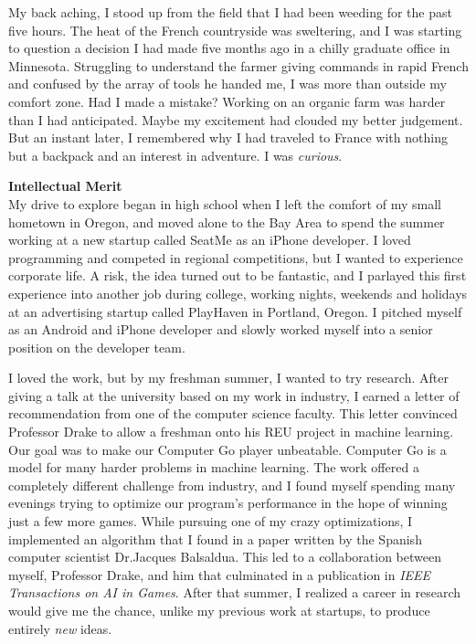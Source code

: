 \documentclass[12pt]{article}
\title{}
\begin{document}
My back aching, I stood up from the field that I had been weeding for the past five hours. The heat of the French countryside was sweltering, and I was starting to question a  decision I had made five months ago in a chilly graduate office in Minnesota. Struggling to understand the farmer giving commands in rapid French and confused by the array of tools he handed me, I was more than outside my comfort zone. Had I made a mistake? Working on an organic farm was harder than I had anticipated. Maybe my excitement had clouded my better judgement. But an instant later, I remembered why I had traveled to France with nothing but a backpack and an interest in adventure. I was \textit{curious}.  

\textbf{Intellectual Merit}\\
My drive to explore began in high school when I left the comfort of my small hometown in Oregon, and moved alone to the Bay Area to spend the summer working at a new startup called SeatMe as an iPhone developer. I loved programming and competed in regional competitions, but I wanted to experience corporate life. A risk, the idea turned out to be fantastic, and I parlayed this first experience into another job during college, working nights, weekends and holidays at an advertising startup called PlayHaven in Portland, Oregon. I pitched myself as an Android and iPhone developer and slowly worked myself into a senior position on the developer team. 

I loved the work, but by my freshman summer, I wanted to try research. After giving a talk at the university based on my work in industry, I earned a letter of recommendation from one of the computer science faculty. This letter convinced Professor Drake to allow a freshman onto his REU project in machine learning. Our goal was to make our Computer Go player unbeatable. Computer Go is a model for many harder problems in machine learning. The work offered a completely different challenge from industry, and I found myself spending many evenings trying to optimize our program's performance in the hope of winning just a few more games. While pursuing one of my crazy optimizations, I implemented an algorithm that I found in a paper written by the Spanish computer scientist Dr.\thinspace Jacques Balsaldua. This led to a collaboration between myself, Professor Drake, and him that culminated in a publication in \textit{IEEE Transactions on AI in Games}. After that summer, I realized a career in research would give me the chance, unlike my previous work at startups, to produce entirely \textit{new} ideas.
\end{document}
